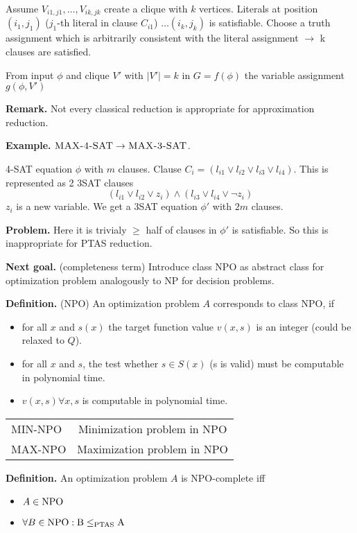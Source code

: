 \documentclass[a4paper]{article}
\newcommand{\cls}[1]{\rm{#1}}
\newcommand{\probl}[1]{\text{\textsc{#1}}}
\begin{document}
Assume $V_{i1,j1}, \ldots, V_{ik,jk}$ create a clique with $k$ vertices.
Literals at position $(i_1, j_1)$ ($j_1$-th literal in clause $C_{i1}$)
$\ldots (i_k, j_k)$ is satisfiable.
Choose a truth assignment which is arbitrarily consistent with
the literal assignment $\rightarrow$ k clauses are satisfied.

From input $\phi$ and clique $V'$ with $|V'| = k$ in $G = f(\phi)$
the variable assignment $g(\phi, V')$ 

\textbf{Remark.}
  Not every classical reduction is appropriate for approximation reduction.

\textbf{Example.}
  $\probl{MAX-4-SAT} \rightarrow \probl{MAX-3-SAT}$.

4-SAT equation $\phi$ with $m$ clauses. Clause $C_i = (l_{i1} \lor l_{i2}
\lor l_{i3} \lor l_{i4})$. This is represented as 2 3SAT clauses
\[
  (l_{i1} \lor l_{i2} \lor z_{i}) \land (l_{i3} \lor l_{i4} \lor \neg z_i)
\]
$z_i$ is a new variable.
We get a 3SAT equation $\phi'$ with $2m$ clauses.

\textbf{Problem.}
  Here it is trivialy $\geq$ half of clauses in $\phi'$ is satisfiable.
  So this is inappropriate for PTAS reduction.

\textbf{Next goal.} (completeness term)
  Introduce class \cls{NPO} as abstract class for optimization problem
  analogously to \cls{NP} for decision problems.

\textbf{Definition.} (\cls{NP}O)
  An optimization problem $A$ corresponds to class \cls{NP}O, if
\begin{itemize}
  \item
    for all $x$ and $s(x)$ the target function value $v(x, s)$
    is an integer (could be relaxed to $Q$).
  \item
    for all $x$ and $s$, the test whether $s \in S(x)$ (s is valid)
    must be computable in polynomial time.
  \item $v(x, s) \forall x, s$ is computable in polynomial time.
\end{itemize}

\begin{center}
  \begin{tabular}{lc}
    MIN-NPO & Minimization problem in \cls{NP}O \\
    MAX-NPO & Maximization problem in \cls{NP}O
  \end{tabular}
\end{center}

\textbf{Definition.}
  An optimization problem $A$ is \cls{NP}O-complete iff
\begin{itemize}
  \item $A \in \cls{NPO}$
  \item $\forall B \in \cls{NPO}: B \leq_{\cls{PTAS}} A$
\end{itemize}
\end{document}
